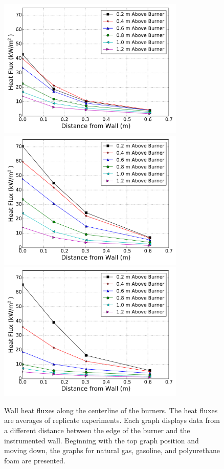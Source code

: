 \documentclass[twoside]{uocthesis}
\begin{document}
{\begin{figure}[p]
	\centering
	\includegraphics[width=3.5in]{../Figures/NCTW_NG_HF_Center_Avg} \\
	\includegraphics[width=3.5in]{../Figures/NCTW_GAS_HF_Center_Avg}\\
	\includegraphics[width=3.5in]{../Figures/NCTW_PUF_HF_Center_Avg} \\
	\caption[Wall heat flux along the centerline of the burners]{Wall heat fluxes along the centerline of the burners.  The heat fluxes are averages of replicate experiments. Each graph displays data from a different distance between the edge of the burner and the instrumented wall.  Beginning with the top graph position and moving down, the graphs for natural gas, gasoline, and polyurethane foam are presented.}
	\label{NCTW_HF_Center_Comp}
\end{figure}

}
\end{document}
